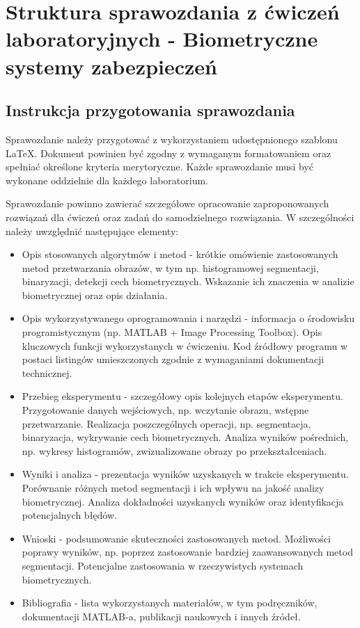 \chapter{Struktura sprawozdania z ćwiczeń laboratoryjnych - Biometryczne systemy zabezpieczeń}
\label{cha:elementySprBSZ}

\section{Instrukcja przygotowania sprawozdania}
Sprawozdanie należy przygotować z wykorzystaniem udostępnionego szablonu \LaTeX. Dokument powinien być zgodny z wymaganym formatowaniem oraz spełniać określone kryteria merytoryczne. Każde sprawozdanie musi być wykonane oddzielnie dla każdego laboratorium.

Sprawozdanie powinno zawierać szczegółowe opracowanie zaproponowanych rozwiązań dla ćwiczeń oraz zadań do samodzielnego rozwiązania. W szczególności należy uwzględnić następujące elementy:
\begin{itemize}
    \item Opis stosowanych algorytmów i metod - krótkie omówienie zastosowanych metod przetwarzania obrazów, w tym np. histogramowej segmentacji, binaryzacji, detekcji cech biometrycznych. Wskazanie ich znaczenia w analizie biometrycznej oraz opis działania.
    \item Opis wykorzystywanego oprogramowania i narzędzi - informacja o środowisku programistycznym (np. MATLAB + Image Processing Toolbox). Opis kluczowych funkcji wykorzystanych w ćwiczeniu. Kod źródłowy programu w postaci listingów umieszczonych zgodnie z wymaganiami dokumentacji technicznej.
    \item Przebieg eksperymentu - szczegółowy opis kolejnych etapów eksperymentu. Przygotowanie danych wejściowych, np. wczytanie obrazu, wstępne przetwarzanie. Realizacja poszczególnych operacji, np. segmentacja, binaryzacja, wykrywanie cech biometrycznych. Analiza wyników pośrednich, np. wykresy histogramów, zwizualizowane obrazy po przekształceniach.
    \item Wyniki i analiza - prezentacja wyników uzyskanych w trakcie eksperymentu. Porównanie różnych metod segmentacji i ich wpływu na jakość analizy biometrycznej. Analiza dokładności uzyskanych wyników oraz identyfikacja potencjalnych błędów.
    \item Wnioski - podsumowanie skuteczności zastosowanych metod. Możliwości poprawy wyników, np. poprzez zastosowanie bardziej zaawansowanych metod segmentacji. Potencjalne zastosowania w rzeczywistych systemach biometrycznych.
    \item Bibliografia - lista wykorzystanych materiałów, w tym podręczników, dokumentacji MATLAB-a, publikacji naukowych i innych źródeł.
\end{itemize}

